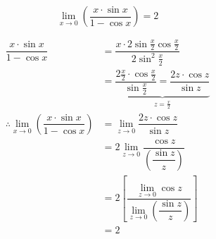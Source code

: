 \documentclass[14pt,fleqn]{extarticle}
\begin{document}
 

\begin{snippet}
    \correct

\[ \lim_{x\to 0}\left( \dfrac{x\cdot\sin x}{1-\cos x} \right) = 2 \]    
   
    \reason

\begin{align}
\dfrac{x\cdot\sin x}{1-\cos x} &= \dfrac{x\cdot 2\sin\frac{x}{2}\cos\frac{x}{2}}{2\sin^2\frac{x}{2}} \\
&= \underbrace{\dfrac{2\frac{x}{2}\cdot\cos\frac{x}{2}}{\sin\frac{x}{2}} = \dfrac{2z\cdot\cos z}{\sin z}}_{z = \frac{x}{2}}\\
\therefore \lim_{x\to 0}\left( \dfrac{x\cdot\sin x}{1-\cos x} \right) &= \lim_{z\to 0}\dfrac{2z\cdot\cos z}{\sin z} \\
&= 2\lim_{z\to 0}\dfrac{\cos z}{\left(\dfrac{\sin z}{z}\right)} \\
&= 2\left[ \dfrac{\lim_{z\to 0}\cos z}{\lim_{z\to 0}\left( \dfrac{\sin z}{z}\right)}\right] \\
&= 2
\end{align}
    
\end{snippet} 
\end{document}
